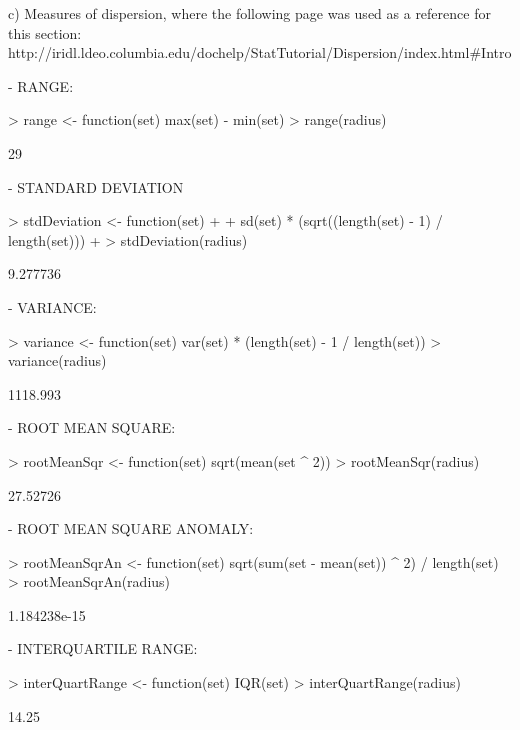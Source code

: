 \documentclass[a4paper]{article}
\begin{document}
		c) Measures of dispersion, where the following page was used as a reference for this section:
		http://iridl.ldeo.columbia.edu/dochelp/StatTutorial/Dispersion/index.html#Intro

			- RANGE:
\begin{Schunk}
\begin{Sinput}
> range <- function(set) {max(set) - min(set)}
> range(radius)
\end{Sinput}
\begin{Soutput}
[1] 29
\end{Soutput}
\end{Schunk}
			- STANDARD DEVIATION
\begin{Schunk}
\begin{Sinput}
> stdDeviation <- function(set) 
+ {
+    sd(set) * (sqrt((length(set) - 1) / length(set)))
+ }
> stdDeviation(radius)
\end{Sinput}
\begin{Soutput}
[1] 9.277736
\end{Soutput}
\end{Schunk}
			- VARIANCE:
\begin{Schunk}
\begin{Sinput}
> variance <- function(set) {var(set) * (length(set) - 1 / length(set))} 
> variance(radius)
\end{Sinput}
\begin{Soutput}
[1] 1118.993
\end{Soutput}
\end{Schunk}
			- ROOT MEAN SQUARE: 
\begin{Schunk}
\begin{Sinput}
> rootMeanSqr <- function(set) {sqrt(mean(set ^ 2))}
> rootMeanSqr(radius)
\end{Sinput}
\begin{Soutput}
[1] 27.52726
\end{Soutput}
\end{Schunk}
			- ROOT MEAN SQUARE ANOMALY:
\begin{Schunk}
\begin{Sinput}
> rootMeanSqrAn <- function(set) {sqrt(sum(set - mean(set)) ^ 2) / length(set)}
> rootMeanSqrAn(radius)
\end{Sinput}
\begin{Soutput}
[1] 1.184238e-15
\end{Soutput}
\end{Schunk}
			- INTERQUARTILE RANGE:
\begin{Schunk}
\begin{Sinput}
> interQuartRange <- function(set) {IQR(set)}
> interQuartRange(radius)
\end{Sinput}
\begin{Soutput}
[1] 14.25
\end{Soutput}
\end{Schunk}
\end{document}
